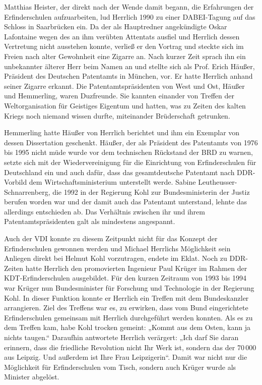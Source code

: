\documentclass[11pt,a4paper]{article}
\begin{document}
Matthias Heister, der direkt nach der Wende damit begann, die Erfahrungen der
Erfinderschulen aufzuarbeiten, lud Herrlich 1990 zu einer DABEI-Tagung auf das
Schloss in Saarbrücken ein. Da der als Hauptredner angekündigte Oskar
Lafontaine wegen des an ihm verübten Attentats ausfiel und Herrlich dessen
Vertretung nicht ausstehen konnte, verließ er den Vortrag und steckte sich im
Freien nach alter Gewohnheit eine Zigarre an.  Nach kurzer Zeit sprach ihn ein
unbekannter älterer Herr beim Namen an und stellte sich als Prof. Erich
Häußer, Präsident des Deutschen Patentamts in München, vor. Er hatte Herrlich
anhand seiner Zigarre erkannt. Die Patentamtspräsidenten von West und Ost,
Häußer und Hemmerling, waren Duzfreunde. Sie kannten einander von Treffen der
Weltorganisation für Geistiges Eigentum und hatten, was zu Zeiten des kalten
Kriegs noch niemand wissen durfte, miteinander Brüderschaft getrunken.

Hemmerling hatte Häußer von Herrlich berichtet und ihm ein Exemplar von dessen
Dissertation geschenkt. Häußer, der als Präsident des Patentamts von 1976 bis
1995 nicht müde wurde vor dem technischen Rückstand der BRD zu warnen, setzte
sich mit der Wiedervereinigung für die Einrichtung von Erfinderschulen für
Deutschland ein und auch dafür, dass das gesamtdeutsche Patentamt nach
DDR-Vorbild dem Wirtschaftsministerium unterstellt werde. Sabine
Leutheusser-Schnarrenberg, die 1992 in der Regierung Kohl zur Bundesministerin
der Justiz berufen worden war und der damit auch das Patentamt unterstand,
lehnte das allerdings entschieden ab. Das Verhältnis zwischen ihr und ihrem
Patentamtspräsidenten galt als mindestens angespannt.

Auch der VDI konnte zu diesem Zeitpunkt nicht für das Konzept der
Erfinderschulen gewonnen werden und Michael Herrlichs Möglichkeit sein
Anliegen direkt bei Helmut Kohl vorzutragen, endete im Eklat. Noch zu
DDR-Zeiten hatte Herrlich den promovierten Ingenieur Paul Krüger im Rahmen der
KDT-Erfinderschulen ausgebildet. Für den kurzen Zeitraum von 1993 bis 1994 war
Krüger nun Bundesminister für Forschung und Technologie in der Regierung Kohl.
In dieser Funktion konnte er Herrlich ein Treffen mit dem Bundeskanzler
arrangieren. Ziel des Treffens war es, zu erwirken, dass vom Bund
eingerichtete Erfinderschulen gemeinsam mit Herrlich durchgeführt werden
konnten.  Als es zu dem Treffen kam, habe Kohl trocken gemeint: „Kommt aus dem
Osten, kann ja nichts taugen.“ Daraufhin antwortete Herrlich verärgert: „Ich
darf Sie daran erinnern, dass die friedliche Revolution nicht Ihr Werk ist,
sondern das der 70\,000 aus Leipzig. Und außerdem ist Ihre Frau Leipzigerin“.
Damit war nicht nur die Möglichkeit für Erfinderschulen vom Tisch, sondern
auch Krüger wurde als Minister abgelöst.
\end{document}
